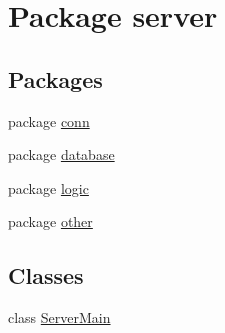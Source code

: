 \hypertarget{namespaceserver}{}\section{Package server}
\label{namespaceserver}
\subsection*{Packages}
\begin{DoxyCompactItemize}
\item 
package \hyperlink{namespaceserver_1_1conn}{conn}
\item 
package \hyperlink{namespaceserver_1_1database}{database}
\item 
package \hyperlink{namespaceserver_1_1logic}{logic}
\item 
package \hyperlink{namespaceserver_1_1other}{other}
\end{DoxyCompactItemize}
\subsection*{Classes}
\begin{DoxyCompactItemize}
\item 
class \hyperlink{classserver_1_1_server_main}{Server\+Main}
\end{DoxyCompactItemize}
